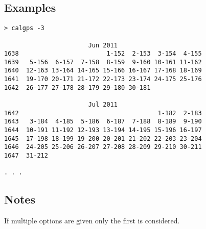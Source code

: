 \subsection{Examples}
\begin{\outputsize}
\begin{verbatim}
> calgps -3

                       Jun 2011
1638                        1-152  2-153  3-154  4-155 
1639   5-156  6-157  7-158  8-159  9-160 10-161 11-162 
1640  12-163 13-164 14-165 15-166 16-167 17-168 18-169 
1641  19-170 20-171 21-172 22-173 23-174 24-175 25-176 
1642  26-177 27-178 28-179 29-180 30-181               

                       Jul 2011
1642                                      1-182  2-183 
1643   3-184  4-185  5-186  6-187  7-188  8-189  9-190 
1644  10-191 11-192 12-193 13-194 14-195 15-196 16-197 
1645  17-198 18-199 19-200 20-201 21-202 22-203 23-204 
1646  24-205 25-206 26-207 27-208 28-209 29-210 30-211 
1647  31-212                                           

. . .
\end{verbatim}
\end{\outputsize}
\subsection{Notes}
If multiple options are given only the first is considered.

%

